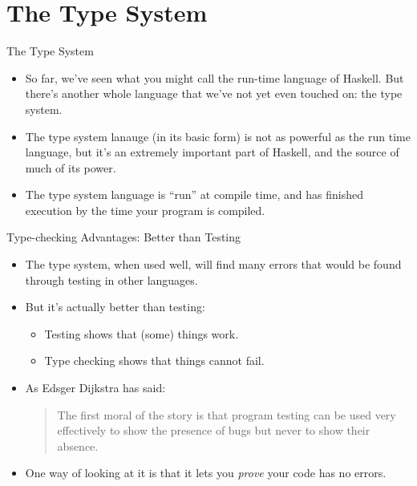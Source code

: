 \documentclass[xcolor=dvipsnames]{beamer}          %
\begin{document}
\section{The Type System}

\begin{frame}[fragile]{The Type System}
\begin{itemize}
    \item So far, we've seen what you might call the run-time language
        of Haskell. But there's another whole language that we've not
        yet even touched on: the type system.
    \item The type system lanauge (in its basic form) is not as powerful
         as the run time language, but it's an extremely important part
         of Haskell, and the source of much of its power.
    \item The type system language is ``run'' at compile time, and has
        finished execution by the time your program is compiled.
\end{itemize}
\end{frame}


\begin{frame}[fragile]{Type-checking Advantages: Better than Testing}
\begin{itemize}
    \item The type system, when used well, will find many errors that
        would be found through testing in other languages.
    \item But it's actually better than testing:
        \begin{itemize}
            \item Testing shows that (some) things work.
            \item Type checking shows that things cannot fail.
        \end{itemize}
    \item As Edsger Dijkstra has said:\\
        \begin{quote}
        The first moral of the story is that program testing can be used very
        effectively to show the presence of bugs but never to show their
        absence.
        \end{quote}
    \item One way of looking at it is that it lets you \emph{prove} your
        code has no errors.
\end{itemize}
\end{frame}
\end{document}
